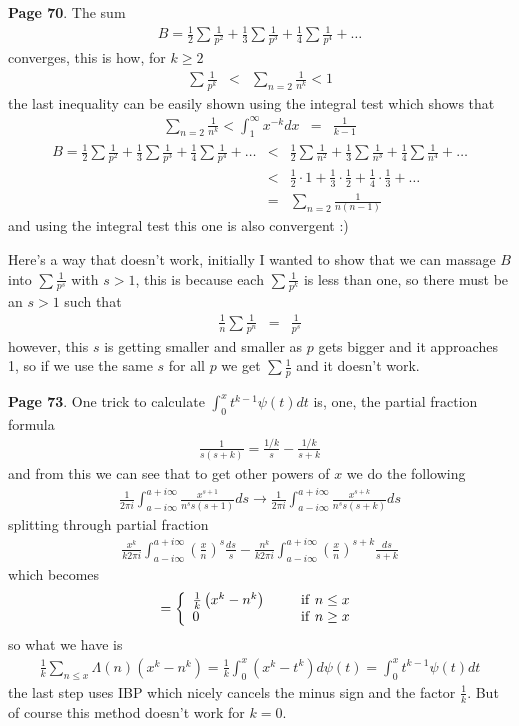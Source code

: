 \documentclass[aps,preprint,preprintnumbers,nofootinbib,showpacs,prd]{revtex4-1}
\newcommand{\nbea}{\begin{eqnarray*}}
\newcommand{\neea}{\end{eqnarray*}}
\begin{document}
{\bf Page 70}. The sum
%
\nbea
B = \frac{1}{2} \sum\frac{1}{p^2} + \frac{1}{3} \sum\frac{1}{p^3} + \frac{1}{4} \sum\frac{1}{p^4} + \dots
\neea
%
converges, this is how, for $k \ge 2$
%
\nbea
\sum \frac{1}{p^k} & < & \sum_{n=2} \frac{1}{n^k} < 1
\neea
%
the last inequality can be easily shown using the integral test which shows that
%
\nbea
\sum_{n=2} \frac{1}{n^k} < \int_1^\infty x^{-k} dx & = & \frac{1}{k - 1}
\neea
%
%
\nbea
B = \frac{1}{2} \sum\frac{1}{p^2} + \frac{1}{3} \sum\frac{1}{p^3} + \frac{1}{4} \sum\frac{1}{p^4} + \dots & < & \frac{1}{2} \sum\frac{1}{n^2} + \frac{1}{3} \sum\frac{1}{n^3} + \frac{1}{4} \sum\frac{1}{n^4} + \dots \\
& < & \frac{1}{2} \cdot1 + \frac{1}{3} \cdot\frac{1}{2} + \frac{1}{4} \cdot \frac{1}{3} + \dots \\
& = & \sum_{n=2}\frac{1}{n(n-1)}
\neea
%
and using the integral test this one is also convergent :)

Here's a way that doesn't work, initially I wanted to show that we can massage $B$ into $\sum \frac{1}{p^s}$ with $s > 1$, this is because each $\sum \frac{1}{p^k}$ is less than one, so there must be an $s > 1$ such that 
%
\nbea
\frac{1}{n}\sum\frac{1}{p^n} & = & \frac{1}{p^s}
\neea
%
however, this $s$ is getting smaller and smaller as $p$ gets bigger and it approaches 1, so if we use the same $s$ for all $p$ we get $\sum \frac{1}{p}$ and it doesn't work.





{\bf Page 73}. One trick to calculate $\int_0^x t^{k-1} \psi(t) dt$ is, one, the partial fraction formula
%
\nbea
\frac{1}{s(s+k)} = \frac{1/k}{s} - \frac{1/k}{s + k}
\neea
%
and from this we can see that to get other powers of $x$ we do the following
%
\nbea
\frac{1}{2\pi i} \int_{a - i\infty}^{a + i\infty} \frac{x^{s+1}}{n^s s (s+1)} ds \to \frac{1}{2\pi i} \int_{a - i\infty}^{a + i\infty} \frac{x^{s+k}}{n^s s (s+k)} ds
\neea
%
splitting through partial fraction
%
\nbea
\frac{x^k}{k 2\pi i} \int_{a - i\infty}^{a + i\infty} \left(\frac{x}{n}\right)^{s} \frac {ds}{s}-\frac{n^k}{k 2\pi i} \int_{a - i\infty}^{a + i\infty} \left(\frac{x}{n}\right)^{s+k} \frac {ds}{s+k}
\neea
%
which becomes
%
\nbea
 = \left\{
 \begin{array}{ ll }
 \frac{1}{k} \left ( x^k - n^k\right ) ~~~~~ & {\rm if~} n \le x \\
 0 ~~~~~ & {\rm if~} n \ge x
 \end{array}
 \right.
\neea
%
so what we have is 
%
\nbea
\frac{1}{k} \sum_{n \le x} \Lambda(n) (x^k - n^k) = \frac{1}{k} \int_0^x (x^k - t^k) d\psi(t) = \int_0^x t^{k-1} \psi(t) dt
\neea
%
the last step uses IBP which nicely cancels the minus sign and the factor $\frac{1}{k}$. But of course this method doesn't work for $k = 0.$
\end{document}
